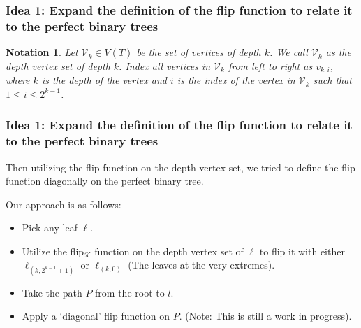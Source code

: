 \documentclass[10pt,]{beamer}
\theoremstyle{conjectureStyle}
\theoremstyle{notationStyle}
\newtheorem*{notation}{Notation}
\theoremstyle{claimStyle}
\begin{document}
\begin{frame}\frametitle{Idea 1: Expand the definition of the flip function to relate it to the perfect binary trees}
    \begin{notation}
        Let $\mathcal{V}_k \in V(T)$ be the set of vertices of depth $k$. We call $\mathcal{V}_k$ as the depth vertex set of depth $k$. Index all vertices in $\mathcal{V}_k$ from left to right as $v_{k, i}$, where $k$ is the depth of the vertex and $i$ is the index of the vertex in $\mathcal{V}_k$ such that $1 \leq i \leq 2^{k - 1}$.
    \end{notation}
    \begin{figure}
        \centering
    \end{figure}
\end{frame}


\begin{frame}\frametitle{Idea 1: Expand the definition of the flip function to relate it to the perfect binary trees}
    Then utilizing the flip function on the depth vertex set, we tried to define the flip function diagonally on the perfect binary tree.

    Our approach is as follows:

    \begin{itemize}
        \item Pick any leaf $\ell$.
        \item Utilize the flip$_\mathcal{K}$ function on the depth vertex set of $\ell$ to flip it with either $\ell_{(k, 2^{k - 1} + 1)}$ or $\ell_{(k, 0)}$ (The leaves at the very extremes).
        \item Take the path $P$ from the root to $l$.
        \item Apply a `diagonal' flip function on $P$. (Note: This is still a work in progress).
    \end{itemize}
\end{frame}
\end{document}
